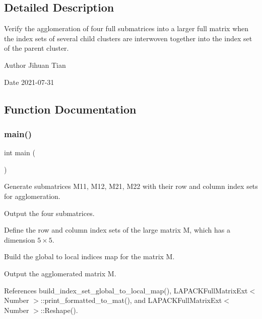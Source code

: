 \subsection{Detailed Description}
Verify the agglomeration of four full submatrices into a larger full matrix when the index sets of several child clusters are interwoven together into the index set of the parent cluster. 

\begin{DoxyAuthor}{Author}
Jihuan Tian 
\end{DoxyAuthor}
\begin{DoxyDate}{Date}
2021-\/07-\/31 
\end{DoxyDate}


\subsection{Function Documentation}
\mbox{\label{lapack-matrix-agglomeration-interwoven-indices_8cc_ae66f6b31b5ad750f1fe042a706a4e3d4}} 
\subsubsection{\texorpdfstring{main()}{main()}}
{\footnotesize\ttfamily int main (\begin{DoxyParamCaption}{ }\end{DoxyParamCaption})}

Generate submatrices {\ttfamily M11}, {\ttfamily M12}, {\ttfamily M21}, {\ttfamily M22} with their row and column index sets for agglomeration.

Output the four submatrices.

Define the row and column index sets of the large matrix {\ttfamily M}, which has a dimension $5 \times 5$.

Build the global to local indices map for the matrix {\ttfamily M}.

Output the agglomerated matrix {\ttfamily M}.

References build\+\_\+index\+\_\+set\+\_\+global\+\_\+to\+\_\+local\+\_\+map(), L\+A\+P\+A\+C\+K\+Full\+Matrix\+Ext$<$ Number $>$\+::print\+\_\+formatted\+\_\+to\+\_\+mat(), and L\+A\+P\+A\+C\+K\+Full\+Matrix\+Ext$<$ Number $>$\+::\+Reshape().

